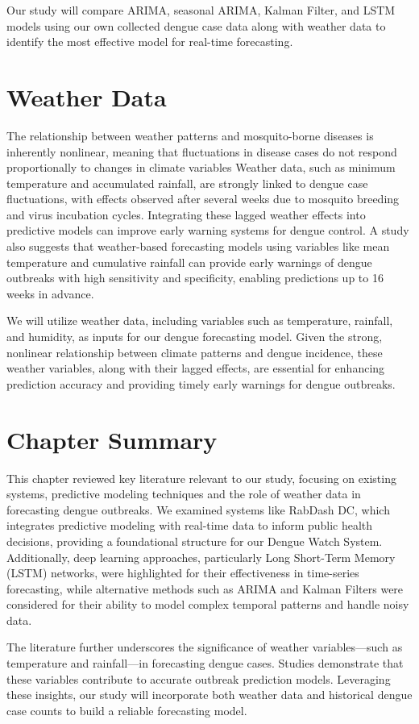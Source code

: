 Our study will compare ARIMA, seasonal ARIMA, Kalman Filter, and LSTM models using our own collected dengue case data along with weather data to identify the most effective model for real-time forecasting.

\section{Weather Data}
The relationship between weather patterns and mosquito-borne diseases is inherently nonlinear, meaning that fluctuations in disease cases do not respond proportionally to changes in climate variables\cite{colon2013effects} Weather data, such as minimum temperature and accumulated rainfall, are strongly linked to dengue case fluctuations, with effects observed after several weeks due to mosquito breeding and virus incubation cycles. Integrating these lagged weather effects into predictive models can improve early warning systems for dengue control\cite{cheong2013assessing}. A study also suggests that weather-based forecasting models using variables like mean temperature and cumulative rainfall can provide early warnings of dengue outbreaks with high sensitivity and specificity, enabling predictions up to 16 weeks in advance\cite{hii2012forecast}.

We will utilize weather data, including variables such as temperature, rainfall, and humidity, as inputs for our dengue forecasting model. Given the strong, nonlinear relationship between climate patterns and dengue incidence, these weather variables, along with their lagged effects, are essential for enhancing prediction accuracy and providing timely early warnings for dengue outbreaks.


\section{Chapter Summary}
This chapter reviewed key literature relevant to our study, focusing on existing systems, predictive modeling techniques and the role of weather data in forecasting dengue outbreaks. We examined systems like RabDash DC, which integrates predictive modeling with real-time data to inform public health decisions, providing a foundational structure for our Dengue Watch System. Additionally, deep learning approaches, particularly Long Short-Term Memory (LSTM) networks, were highlighted for their effectiveness in time-series forecasting, while alternative methods such as ARIMA and Kalman Filters were considered for their ability to model complex temporal patterns and handle noisy data.

The literature further underscores the significance of weather variables—such as temperature and rainfall—in forecasting dengue cases. Studies demonstrate that these variables contribute to accurate outbreak prediction models. Leveraging these insights, our study will incorporate both weather data and historical dengue case counts to build a reliable forecasting model.







